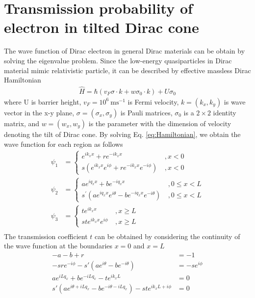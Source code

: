 \section{Transmission probability of electron in tilted Dirac cone}
    The wave function of Dirac electron in general Dirac materials can be obtain by solving the eigenvalue problem.
    Since the low-energy quasiparticles in Dirac material mimic relativistic particle, it can be described by effective massless Dirac Hamiltonian
    \begin{align} \label{eq:Hamiltonian}
        \hat{H} = \hbar (v_F \sigma \cdot k + w \sigma_0 \cdot k) + U \sigma_0
    \end{align}
    where U is barrier height, $v_F=10^6\ \mathrm{ms^{-1}}$ is Fermi velocity, $k=(k_x,k_y)$ is wave vector in the x-y plane, 
    $\sigma=(\sigma_x,\sigma_y)$ is Pauli matrices, $\sigma_0$ is a $2\times2$ identity matrix, 
    and $w=(w_x,w_y)$ is the parameter with the dimension of velocity denoting the tilt of Dirac cone.
    By solving Eq. \ref{eq:Hamiltonian}, we obtain the wave function for each region as follows
    \begin{equation}
    \begin{aligned}
        \psi_1 &= 
        \begin{cases}
            e^{ik_xx} +re^{-ik_xx} \ &, x<0\\
            s(e^{ik_xx}e^{i\phi} +re^{-ik_xx}e^{-i\phi}) \ &, x < 0
        \end{cases}\\
        \psi_2 &=
        \begin{cases}
            ae^{iq_xx} +be^{-iq_xx} \ &, 0\leq x<L\\
            s^\prime(ae^{iq_xx}e^{i\theta} -be^{-iq_xx}e^{-i\theta} )\  &, 0\leq x<L
        \end{cases}\\
        \psi_3 &=
        \begin{cases}
            te^{ik_xx}\ & ,x\geq L\\
            ste^{ik_xx}e^{i\phi}\ & ,x\geq L
        \end{cases}\\
    \end{aligned}
    \end{equation}
    The transmission coefficient $t$ can be obtained by considering the continuity of the wave function at the boundaries $x = 0$ and $x=L$
    \begin{equation} \label{eq:boundary condition}
        \begin{aligned}
            -a-b+r &= -1\\
            -sr e^{-i \phi }-s' \left(a e^{i \theta }-b e^{-i \theta }\right) &= -se^{i \phi }\\
            a e^{i L q_x}+b e^{-i L q_x}-t e^{i k_x L}&=0\\
            s' \left(a e^{i \theta +i L q_x}-b e^{-i \theta -i L q_x}\right)-s t e^{i k_x L+i \phi }&=0\\
        \end{aligned}
    \end{equation}
